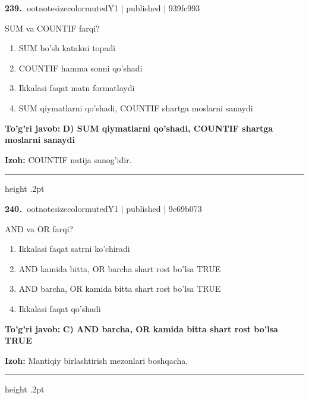 \documentclass[10pt,a4paper]{article}
\begin{document}
\textbf{\color{ink}239.} {ootnotesizecolor{muted}Y1 | published | 939fc993}
\par
SUM va COUNTIF farqi?
\begin{enumerate}[label=\Alph*),leftmargin=9mm]
\item SUM bo'sh katakni topadi
\item COUNTIF hamma sonni qo'shadi
\item Ikkalasi faqat matn formatlaydi
\item SUM qiymatlarni qo'shadi, COUNTIF shartga moslarni sanaydi
\end{enumerate}
\begin{tcolorbox}[enhanced,breakable,colback=teal!4,colframe=teal!55!black,boxrule=0.45pt,arc=1.2mm,left=2.8mm,right=2.8mm,top=2mm,bottom=2mm]
\textbf{\color{teal}To'g'ri javob:} \textbf{D) SUM qiymatlarni qo'shadi, COUNTIF shartga moslarni sanaydi}
\par\smallskip
\textbf{Izoh:} COUNTIF natija sanog'idir.
\end{tcolorbox}
\vspace{2mm}\hrule height .2pt\vspace{2mm}

\textbf{\color{ink}240.} {ootnotesizecolor{muted}Y1 | published | 9c69b073}
\par
AND va OR farqi?
\begin{enumerate}[label=\Alph*),leftmargin=9mm]
\item Ikkalasi faqat satrni ko'chiradi
\item AND kamida bitta, OR barcha shart rost bo'lsa TRUE
\item AND barcha, OR kamida bitta shart rost bo'lsa TRUE
\item Ikkalasi faqat qo'shadi
\end{enumerate}
\begin{tcolorbox}[enhanced,breakable,colback=teal!4,colframe=teal!55!black,boxrule=0.45pt,arc=1.2mm,left=2.8mm,right=2.8mm,top=2mm,bottom=2mm]
\textbf{\color{teal}To'g'ri javob:} \textbf{C) AND barcha, OR kamida bitta shart rost bo'lsa TRUE}
\par\smallskip
\textbf{Izoh:} Mantiqiy birlashtirish mezonlari boshqacha.
\end{tcolorbox}
\vspace{2mm}\hrule height .2pt\vspace{2mm}
\end{document}
